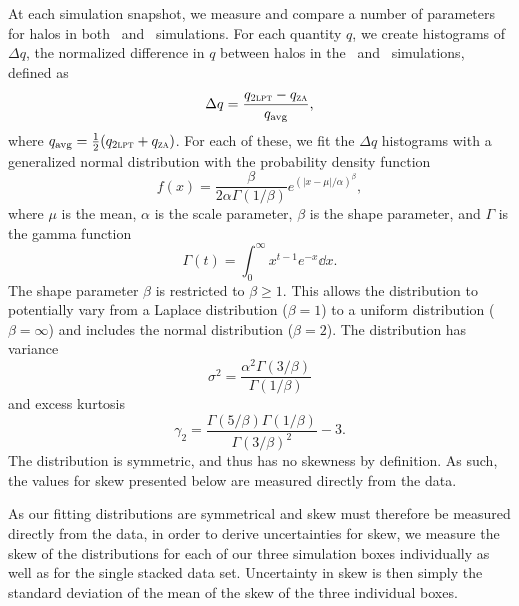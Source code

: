 

At each simulation snapshot, we measure and compare a number of parameters for halos in both \lpt\ and \za\ simulations.  For each quantity $q$, we create histograms of $\Delta q$, the normalized difference in $q$ between halos in the \lpt\ and \za\ simulations, defined as
\begin{equation} \label{eq:delta_q}
	\Delta q = \frac{q_{\textsc{2lpt}} - q_{\textsc{za}}}{q_{\mathrm{avg}}},
\end{equation}
where $q_{\mathrm{avg}} = \frac{1}{2} (q_{\textsc{2lpt}} + q_{\textsc{za}})$.  For each of these, we fit the $\Delta q$ histograms with a generalized normal distribution \citep{doi:10.1080/02664760500079464} with the probability density function
\begin{equation} \label{eq:generalized_normal}
	f(x) = \frac{ \beta }{2 \alpha \Gamma(1 / \beta)} e^{\left( \left| x - \mu \right| / \alpha \right)^{\beta}},
\end{equation}
where $\mu$ is the mean, $\alpha$ is the scale parameter, $\beta$ is the shape parameter, and $\Gamma$ is the gamma function
\begin{equation} \label{eq:gamma_function}
	\Gamma(t) = \int_{0}^{\infty} x^{t-1} e^{-x} \dd x.
\end{equation}
The shape parameter $\beta$ is restricted to $\beta \geq 1$.  This allows the distribution to potentially vary from a Laplace distribution ($\beta = 1$) to a uniform distribution ($\beta = \infty$) and includes the normal distribution ($\beta = 2$).  The distribution has variance
\begin{equation} \label{eq:variance}
	\sigma^{2} = \frac{ \alpha^{2} \Gamma(3/\beta) }{ \Gamma(1/\beta) }
\end{equation}
and excess kurtosis
\begin{equation} \label{eq:kurtosis}
	\gamma_{2} = \frac{ \Gamma(5/\beta) \Gamma(1/\beta) }{ \Gamma(3/\beta)^{2} } - 3.
\end{equation}
The distribution is symmetric, and thus has no skewness by definition.  As such, the values for skew presented below are measured directly from the data.

As our fitting distributions are symmetrical and skew must therefore be measured directly from the data, in order to derive uncertainties for skew, we measure the skew of the distributions for each of our three simulation boxes individually as well as for the single stacked data set.  Uncertainty in skew is then simply the standard deviation of the mean of the skew of the three individual boxes.

